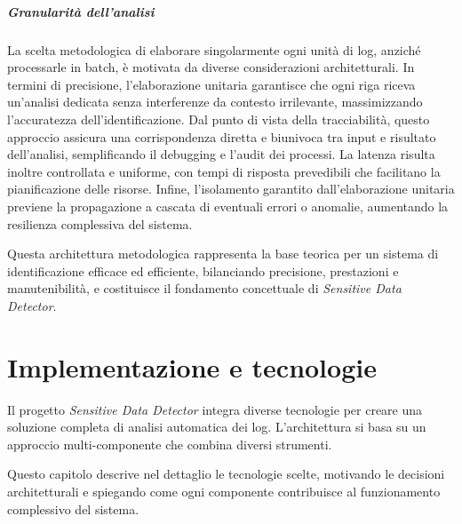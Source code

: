 \documentclass[12pt]{report}
\begin{document}
\paragraph{Granularità dell'analisi}
La scelta metodologica di elaborare singolarmente ogni unità di log, anziché processarle in batch, è motivata da diverse considerazioni architetturali. In termini di precisione, l'elaborazione unitaria garantisce che ogni riga riceva un'analisi dedicata senza interferenze da contesto irrilevante, massimizzando l'accuratezza dell'identificazione. Dal punto di vista della tracciabilità, questo approccio assicura una corrispondenza diretta e biunivoca tra input e risultato dell'analisi, semplificando il debugging e l'audit dei processi. La latenza risulta inoltre controllata e uniforme, con tempi di risposta prevedibili che facilitano la pianificazione delle risorse. Infine, l'isolamento garantito dall'elaborazione unitaria previene la propagazione a cascata di eventuali errori o anomalie, aumentando la resilienza complessiva del sistema.

Questa architettura metodologica rappresenta la base teorica per un sistema di identificazione efficace ed efficiente, bilanciando precisione, prestazioni e manutenibilità, e costituisce il fondamento concettuale di \textit{Sensitive Data Detector}.


%
%

\chapter{Implementazione e tecnologie}
\label{chap:implementazione_tecnologie}

Il progetto \textit{Sensitive Data Detector} integra diverse tecnologie per creare una soluzione completa di analisi automatica dei log. L'architettura si basa su un approccio multi-componente che combina diversi strumenti.

Questo capitolo descrive nel dettaglio le tecnologie scelte, motivando le decisioni architetturali e spiegando come ogni componente contribuisce al funzionamento complessivo del sistema.

\end{document}
